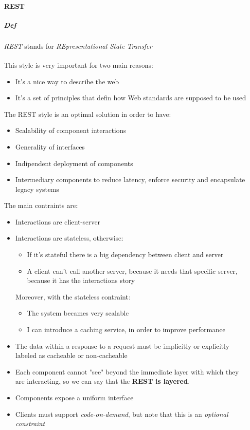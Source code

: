     \paragraph{REST}
    \subparagraph{Def}
    \textit{REST} stands for \textit{REpresentational State Transfer}\\
    \\
    This style is very important for two main reasons:
    \begin{itemize}
        \item It's a nice way to describe the web
        \item It's a set of principles that defin how Web standards
                are supposed to be used
    \end{itemize}
    The REST style is an optimal solution in order to have:
    \begin{itemize}
        \item Scalability of component interactions
        \item Generality of interfaces
        \item Indipendent deployment of components
        \item Intermediary components to reduce latency, enforce
            security and encapsulate legacy systems
    \end{itemize}
    The main contraints are:
    \begin{itemize}
        \item Interactions are client-server
        \item Interactions are stateless, otherwise:
        \begin{itemize}
                \item If it's stateful there is a big dependency between client
                        and server
                \item A client can't call another server, because it needs that
                        specific server, because it has the interactions story 
        \end{itemize}
            Moreover, with the stateless contraint:
        \begin{itemize}
            \item The system becames very scalable
            \item I can introduce a caching service, in order to improve performance
        \end{itemize} 
        \item The data within a response to a request must be implicitly or explicitly
            labeled as cacheable or non-cacheable
        \item Each component cannot "see" beyond the immediate layer with which they
            are interacting, so we can say that the \textbf{REST is layered}.
        \item Components expose a uniform interface
        \item Clients must support \textit{code-on-demand}, but note that this is an 
            \textsl{optional constraint}
    \end{itemize}
    
